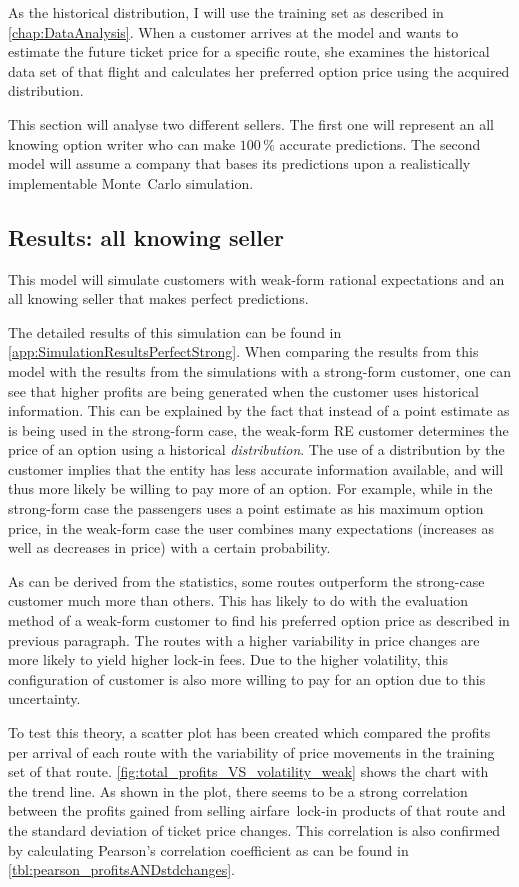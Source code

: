 As the historical distribution, I will use the training set as described in \autoref{chap:DataAnalysis}. When a customer arrives at the model and wants to estimate the future ticket price for a specific route, she examines the historical data set of that flight and calculates her preferred option price using the acquired distribution.

This section will analyse two different sellers. The first one will represent an all knowing option writer who can make $100\,\%$ accurate predictions. The second model will assume a company that bases its predictions upon a realistically implementable Monte~Carlo simulation.

\subsection{Results: all knowing seller}
This model will simulate customers with weak-form rational expectations and an all knowing seller that makes perfect predictions.

The detailed results of this simulation can be found in \autoref{app:SimulationResultsPerfectStrong}. When comparing the results from this model with the results from the simulations with a strong-form customer, one can see that higher profits are being generated when the customer uses historical information. This can be explained by the fact that instead of a point estimate as is being used in the strong-form case, the weak-form RE customer determines the price of an option using a historical \emph{distribution}. The use of a distribution by the customer implies that the entity has less accurate information available, and will thus more likely be willing to pay more of an option. For example, while in the strong-form case the passengers uses a point estimate as his maximum option price, in the weak-form case the user combines many expectations (increases as well as decreases in price) with a certain probability.

As can be derived from the statistics, some routes outperform the strong-case customer much more than others. This has likely to do with the evaluation method of a weak-form customer to find his preferred option price as described in previous paragraph. The routes with a higher variability in price changes are more likely to yield higher lock-in fees. Due to the higher volatility, this configuration of customer is also more willing to pay for an option due to this uncertainty.

To test this theory, a scatter plot has been created which compared the profits per arrival of each route with the variability of price movements in the training set of that route. \autoref{fig:total_profits_VS_volatility_weak} shows the chart with the trend line. As shown in the plot, there seems to be a strong correlation between the profits gained from selling airfare~lock-in products of that route and the standard deviation of ticket price changes. This correlation is also confirmed by calculating Pearson's correlation coefficient as can be found in \autoref{tbl:pearson_profitsANDstdchanges}.

